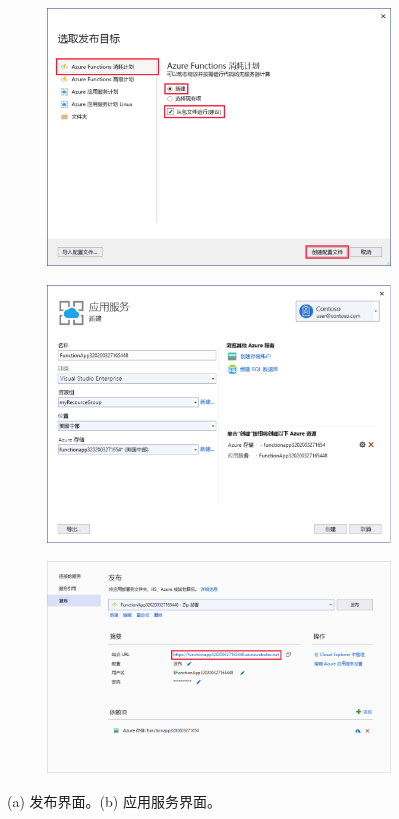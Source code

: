 \documentclass[11pt]{article}
\begin{document}
\begin{figure}[!htbp]
	\begin{subfigure}[b]{0.5\linewidth}
		\includegraphics[width=\linewidth]{figs/8.png}
		\caption{}
		\label{fig8}
	\end{subfigure}
	\begin{subfigure}[b]{0.5\linewidth}
		\includegraphics[width=\linewidth]{figs/9.png}
		\caption{}
		\label{fig9}
	\end{subfigure}
	\begin{subfigure}[b]{\linewidth}
		\centering
		\includegraphics[width=0.6\linewidth]{figs/10.png}
		\caption{}
		\label{fig10}
	\end{subfigure}
	\caption{(a) 发布界面。(b) 应用服务界面。}
\end{figure}
\end{document}
